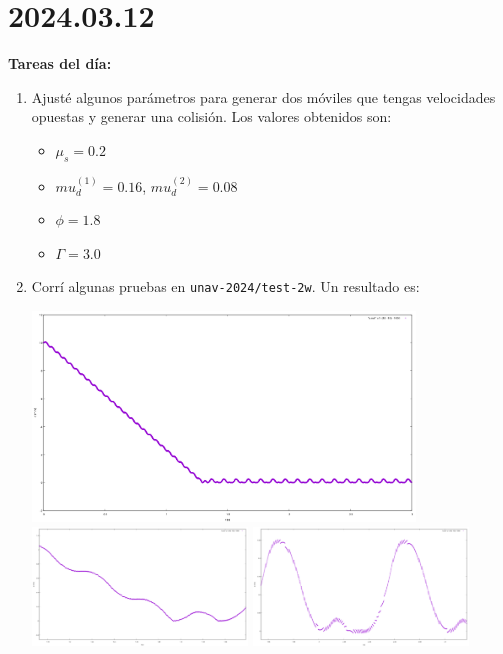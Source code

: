 \documentclass[11pt]{article}
\begin{document}
\section*{2024.03.12}
\textbf{Tareas del día:}
\begin{enumerate}
\item Ajusté algunos parámetros para generar dos móviles que tengas velocidades opuestas y generar una colisión. Los valores obtenidos son:
    \begin{itemize}
      \item $\mu_s = 0.2$
      \item $mu_d^{(1)} = 0.16$, $mu_d^{(2)} = 0.08$
    \item $\phi = 1.8$
    \item $\Gamma = 3.0$
    \end{itemize}
    \item Corrí algunas pruebas en \texttt{unav-2024/test-2w}. Un resultado es:
    \begin{center}
      \includegraphics[width=0.8\textwidth]{figs/dist-2w.png}
      \includegraphics[width=0.45\textwidth]{figs/dist-2w-z1.png}
      \includegraphics[width=0.45\textwidth]{figs/dist-2w-z2.png}
    \end{center}

\end{enumerate}
\end{document}
